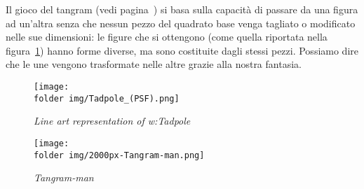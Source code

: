 Il gioco del tangram (vedi pagina~\pageref{tangram}) si basa sulla 
capacità di passare da una figura ad un'altra senza che nessun pezzo 
del quadrato base venga tagliato o modificato nelle sue dimensioni: 
le figure che si ottengono (come quella riportata nella 
figura~\ref{fig:tangramman}) hanno forme diverse, ma sono costituite 
dagli stessi pezzi. Possiamo dire che le une vengono trasformate 
nelle altre grazie alla nostra fantasia.


\begin{inaccessibleblock}
 \begin{figure}[!htb]
\begin{center}
 \noindent\begin{minipage}{0.6\textwidth}
   \centering
   \texttt{[image: \\folder img/Tadpole\_(PSF).png]}
   \caption{\emph{Line art representation of w:Tadpole}\protect\footnotemark}
\label{fig:tadpole}
 \end{minipage}
\hspace{7mm}
 \noindent\begin{minipage}{0.26\textwidth}
  \centering
   \texttt{[image: \\folder img/2000px-Tangram-man.png]}
   
\caption{\emph{Tangram-man}\protect\footnotemark}
\label{fig:tangramman}
 \end{minipage}
\end{center}
\end{figure}
\end{inaccessibleblock}

%
%    
%      

